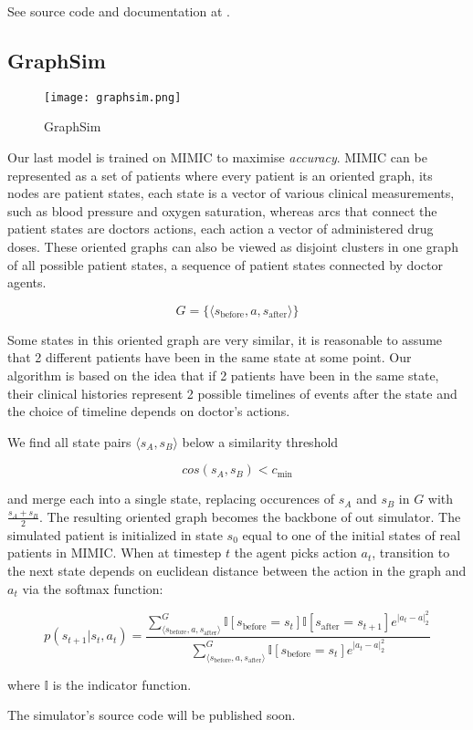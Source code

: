 See source code and documentation at \cite{heartpole}.

\subsection{GraphSim}
\label{sec:graphsim}

\begin{figure*}
    \centering
    \texttt{[image: graphsim.png]}
    \caption{GraphSim}
    \label{fig:graphsim}
\end{figure*}


Our last model is trained on MIMIC \cite{mimic} to maximise \emph{accuracy}.
MIMIC can be represented as a set of patients where every patient is an oriented graph, its nodes are patient states, each state is a vector of various clinical measurements, such as blood pressure and oxygen saturation, whereas arcs that connect the patient states are doctors actions, each action a vector of administered drug doses.
These oriented graphs can also be viewed as disjoint clusters in one graph of all possible patient states, a sequence of patient states connected by doctor agents.

\begin{equation}
  G = \{ \langle s_\text{before}, a, s_\text{after} \rangle \}
\end{equation}

Some states in this oriented graph are very similar, it is reasonable to assume that 2 different patients have been in the same state at some point. Our algorithm is based on the idea that if 2 patients have been in the same state, their clinical histories represent 2 possible timelines of events after the state and the choice of timeline depends on doctor's actions.

We find all state pairs $\langle s_A, s_B \rangle$ below a similarity threshold

\begin{equation}
  cos(s_A,s_B) < c_\text{min}
\end{equation}

and merge each into a single state, replacing occurences of $s_A$ and $s_B$ in $G$ with $\frac{s_A+s_B}{2}$. 
The resulting oriented graph becomes the backbone of out simulator.
The simulated patient is initialized in state $s_0$ equal to one of the initial states of real patients in MIMIC.
When at timestep $t$ the agent picks action $a_t$, transition to the next state depends on euclidean distance between the action in the graph and $a_t$ via the softmax function:

\begin{equation}
  p(s_{t+1}|s_t, a_t) = \frac{\sum_{\langle s_\text{before}, a, s_\text{after} \rangle}^G \mathbb{I}[s_\text{before} = s_{t}] \mathbb{I}[s_\text{after} = s_{t+1}] e^{|a_t - a|_2^2}}{\sum_{\langle s_\text{before}, a, s_\text{after} \rangle}^G \mathbb{I}[s_\text{before} = s_{t}]  e^{|a_t - a|_2^2}}
\end{equation}

where $\mathbb{I}$ is the indicator function.

The simulator's source code will be published soon.